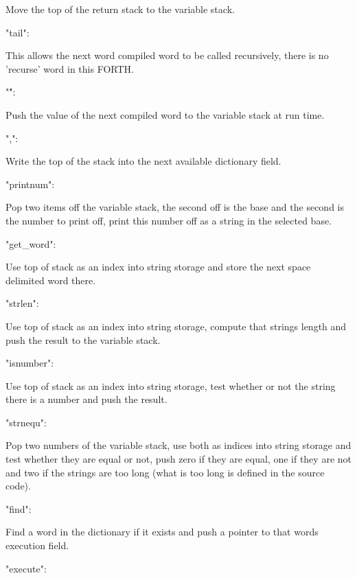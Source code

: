 Move the top of the return stack to the variable stack. \begin{DoxyVerb}   "tail":
\end{DoxyVerb}


This allows the next word compiled word to be called recursively, there is no 'recurse' word in this F\-O\-R\-T\-H. \begin{DoxyVerb}   "\'":
\end{DoxyVerb}


Push the value of the next compiled word to the variable stack at run time. \begin{DoxyVerb}   ",":
\end{DoxyVerb}


Write the top of the stack into the next available dictionary field. \begin{DoxyVerb}   "printnum":
\end{DoxyVerb}


Pop two items off the variable stack, the second off is the base and the second is the number to print off, print this number off as a string in the selected base. \begin{DoxyVerb}   "get\_word":
\end{DoxyVerb}


Use top of stack as an index into string storage and store the next space delimited word there. \begin{DoxyVerb}   "strlen":
\end{DoxyVerb}


Use top of stack as an index into string storage, compute that strings length and push the result to the variable stack. \begin{DoxyVerb}   "isnumber":
\end{DoxyVerb}


Use top of stack as an index into string storage, test whether or not the string there is a number and push the result. \begin{DoxyVerb}   "strnequ":
\end{DoxyVerb}


Pop two numbers of the variable stack, use both as indices into string storage and test whether they are equal or not, push zero if they are equal, one if they are not and two if the strings are too long (what is too long is defined in the source code). \begin{DoxyVerb}   "find":
\end{DoxyVerb}


Find a word in the dictionary if it exists and push a pointer to that words execution field. \begin{DoxyVerb}   "execute":
\end{DoxyVerb}



